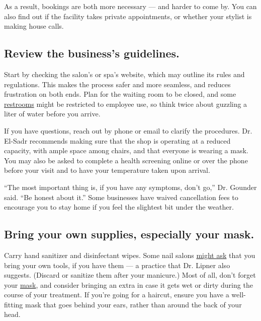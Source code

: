 As a result, bookings are both more necessary --- and harder to come by.
You can also find out if the facility takes private appointments, or
whether your stylist is making house calls.

\hypertarget{review-the-businesss-guidelines}{%
\subsection{Review the business's
guidelines.}\label{review-the-businesss-guidelines}}

Start by checking the salon's or spa's website, which may outline its
rules and regulations. This makes the process safer and more seamless,
and reduces frustration on both ends. Plan for the waiting room to be
closed, and some
\href{https://www.nytimes.com/2020/06/24/style/coronavirus-public-bathrooms.html}{restrooms}
might be restricted to employee use, so think twice about guzzling a
liter of water before you arrive.

If you have questions, reach out by phone or email to clarify the
procedures. Dr. El-Sadr recommends making sure that the shop is
operating at a reduced capacity, with ample space among chairs, and that
everyone is wearing a mask. You may also be asked to complete a health
screening online or over the phone before your visit and to have your
temperature taken upon arrival.

``The most important thing is, if you have any symptoms, don't go,'' Dr.
Gounder said. ``Be honest about it.'' Some businesses have waived
cancellation fees to encourage you to stay home if you feel the
slightest bit under the weather.

\hypertarget{bring-your-own-supplies-especially-your-mask}{%
\subsection{Bring your own supplies, especially your
mask.}\label{bring-your-own-supplies-especially-your-mask}}

Carry hand sanitizer and disinfectant wipes. Some nail salons
\href{https://www.glamour.com/story/nail-salon-coronavirus-safety}{might
ask} that you bring your own tools, if you have them --- a practice that
Dr. Lipner also suggests. (Discard or sanitize them after your
manicure.) Most of all, don't forget your
\href{https://www.nytimes.com/2020/05/22/at-home/best-face-masks-fashion-coronavirus.html}{mask},
and consider bringing an extra in case it gets wet or dirty during the
course of your treatment. If you're going for a haircut, ensure you have
a well-fitting mask that goes behind your ears, rather than around the
back of your head.

